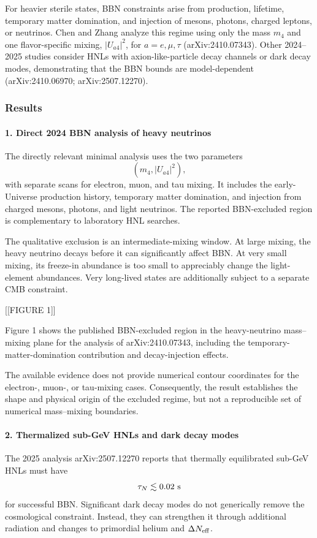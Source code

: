 \documentclass[11pt,a4paper]{article}
\begin{document}
For heavier sterile states, BBN constraints arise from production, lifetime, temporary matter domination, and injection of mesons, photons, charged leptons, or neutrinos. Chen and Zhang analyze this regime using only the mass \(m_4\) and one flavor-specific mixing, \(\lvert U_{a4}\rvert^2\), for \(a=e,\mu,\tau\) (arXiv:2410.07343). Other 2024--2025 studies consider HNLs with axion-like-particle decay channels or dark decay modes, demonstrating that the BBN bounds are model-dependent (arXiv:2410.06970; arXiv:2507.12270).

\subsubsection*{Results}
\paragraph{1. Direct 2024 BBN analysis of heavy neutrinos}
The directly relevant minimal analysis uses the two parameters \[ (m_4,\lvert U_{a4}\rvert^2), \] with separate scans for electron, muon, and tau mixing. It includes the early-Universe production history, temporary matter domination, and injection from charged mesons, photons, and light neutrinos. The reported BBN-excluded region is complementary to laboratory HNL searches.

The qualitative exclusion is an intermediate-mixing window. At large mixing, the heavy neutrino decays before it can significantly affect BBN. At very small mixing, its freeze-in abundance is too small to appreciably change the light-element abundances. Very long-lived states are additionally subject to a separate CMB constraint.

[[FIGURE 1]]

Figure 1 shows the published BBN-excluded region in the heavy-neutrino mass--mixing plane for the analysis of arXiv:2410.07343, including the temporary-matter-domination contribution and decay-injection effects.

The available evidence does not provide numerical contour coordinates for the electron-, muon-, or tau-mixing cases. Consequently, the result establishes the shape and physical origin of the excluded regime, but not a reproducible set of numerical mass--mixing boundaries.

\paragraph{2. Thermalized sub-GeV HNLs and dark decay modes}
The 2025 analysis arXiv:2507.12270 reports that thermally equilibrated sub-GeV HNLs must have \[ \tau_N \lesssim 0.02\ {\rm s} \] for successful BBN. Significant dark decay modes do not generically remove the cosmological constraint. Instead, they can strengthen it through additional radiation and changes to primordial helium and \(\Delta N_{\rm eff}\).
\end{document}

